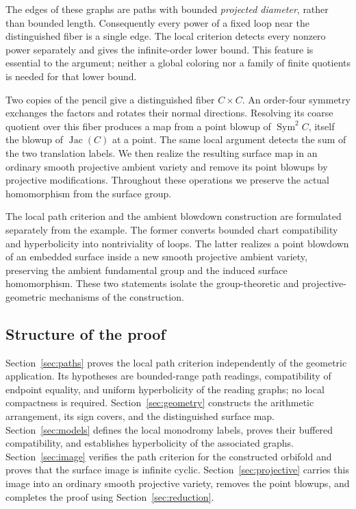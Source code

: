 \documentclass[11pt,reqno]{amsart}
\numberwithin{equation}{section}
\theoremstyle{definition}
\theoremstyle{remark}
\begin{document}
The edges of these graphs are paths with bounded \emph{projected
diameter}, rather than bounded length.  Consequently every power of a
fixed loop near the distinguished fiber is a single edge.  The local
criterion detects every nonzero power separately and gives the
infinite-order lower bound.  This feature is essential to the argument;
neither a global coloring nor a family of finite quotients is needed
for that lower bound.

Two copies of the pencil give a distinguished fiber $C\times C$.
An order-four symmetry exchanges the factors and rotates their normal
directions.  Resolving its coarse quotient over this fiber produces a
map from a point blowup of
$\operatorname{Sym}^2 C$, itself the blowup of $\operatorname{Jac}(C)$ at a point.  The same local
argument detects the sum of the two translation labels.  We then
realize the resulting surface map in an ordinary smooth projective
ambient variety and remove its point blowups by projective
modifications.  Throughout these operations we preserve the actual
homomorphism from the surface group.

The local path criterion and the ambient blowdown construction are
formulated separately from the example.  The former converts bounded
chart compatibility and hyperbolicity into nontriviality of loops.
The latter realizes a point blowdown of an embedded surface inside a
new smooth projective ambient variety, preserving the ambient
fundamental group and the induced surface homomorphism.  These two
statements isolate the group-theoretic and projective-geometric
mechanisms of the construction.

\subsection{Structure of the proof}
Section~\ref{sec:paths} proves the local path criterion independently
of the geometric application.  Its hypotheses are bounded-range path
readings, compatibility of endpoint equality, and uniform hyperbolicity
of the reading graphs; no local compactness is required.
Section~\ref{sec:geometry} constructs the arithmetic arrangement,
its sign covers, and the distinguished surface map.
Section~\ref{sec:models} defines the local monodromy labels, proves
their buffered compatibility, and establishes hyperbolicity of the
associated graphs.  Section~\ref{sec:image} verifies the path
criterion for the constructed orbifold and proves that the surface
image is infinite cyclic.  Section~\ref{sec:projective} carries this
image into an ordinary smooth projective variety, removes the point
blowups, and completes the proof using Section~\ref{sec:reduction}.
\end{document}
